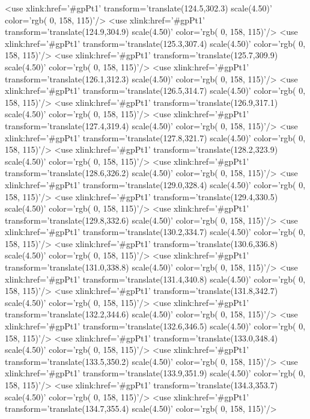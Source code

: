 	<use xlink:href='#gpPt1' transform='translate(124.5,302.3) scale(4.50)' color='rgb(  0, 158, 115)'/>
	<use xlink:href='#gpPt1' transform='translate(124.9,304.9) scale(4.50)' color='rgb(  0, 158, 115)'/>
	<use xlink:href='#gpPt1' transform='translate(125.3,307.4) scale(4.50)' color='rgb(  0, 158, 115)'/>
	<use xlink:href='#gpPt1' transform='translate(125.7,309.9) scale(4.50)' color='rgb(  0, 158, 115)'/>
	<use xlink:href='#gpPt1' transform='translate(126.1,312.3) scale(4.50)' color='rgb(  0, 158, 115)'/>
	<use xlink:href='#gpPt1' transform='translate(126.5,314.7) scale(4.50)' color='rgb(  0, 158, 115)'/>
	<use xlink:href='#gpPt1' transform='translate(126.9,317.1) scale(4.50)' color='rgb(  0, 158, 115)'/>
	<use xlink:href='#gpPt1' transform='translate(127.4,319.4) scale(4.50)' color='rgb(  0, 158, 115)'/>
	<use xlink:href='#gpPt1' transform='translate(127.8,321.7) scale(4.50)' color='rgb(  0, 158, 115)'/>
	<use xlink:href='#gpPt1' transform='translate(128.2,323.9) scale(4.50)' color='rgb(  0, 158, 115)'/>
	<use xlink:href='#gpPt1' transform='translate(128.6,326.2) scale(4.50)' color='rgb(  0, 158, 115)'/>
	<use xlink:href='#gpPt1' transform='translate(129.0,328.4) scale(4.50)' color='rgb(  0, 158, 115)'/>
	<use xlink:href='#gpPt1' transform='translate(129.4,330.5) scale(4.50)' color='rgb(  0, 158, 115)'/>
	<use xlink:href='#gpPt1' transform='translate(129.8,332.6) scale(4.50)' color='rgb(  0, 158, 115)'/>
	<use xlink:href='#gpPt1' transform='translate(130.2,334.7) scale(4.50)' color='rgb(  0, 158, 115)'/>
	<use xlink:href='#gpPt1' transform='translate(130.6,336.8) scale(4.50)' color='rgb(  0, 158, 115)'/>
	<use xlink:href='#gpPt1' transform='translate(131.0,338.8) scale(4.50)' color='rgb(  0, 158, 115)'/>
	<use xlink:href='#gpPt1' transform='translate(131.4,340.8) scale(4.50)' color='rgb(  0, 158, 115)'/>
	<use xlink:href='#gpPt1' transform='translate(131.8,342.7) scale(4.50)' color='rgb(  0, 158, 115)'/>
	<use xlink:href='#gpPt1' transform='translate(132.2,344.6) scale(4.50)' color='rgb(  0, 158, 115)'/>
	<use xlink:href='#gpPt1' transform='translate(132.6,346.5) scale(4.50)' color='rgb(  0, 158, 115)'/>
	<use xlink:href='#gpPt1' transform='translate(133.0,348.4) scale(4.50)' color='rgb(  0, 158, 115)'/>
	<use xlink:href='#gpPt1' transform='translate(133.5,350.2) scale(4.50)' color='rgb(  0, 158, 115)'/>
	<use xlink:href='#gpPt1' transform='translate(133.9,351.9) scale(4.50)' color='rgb(  0, 158, 115)'/>
	<use xlink:href='#gpPt1' transform='translate(134.3,353.7) scale(4.50)' color='rgb(  0, 158, 115)'/>
	<use xlink:href='#gpPt1' transform='translate(134.7,355.4) scale(4.50)' color='rgb(  0, 158, 115)'/>
